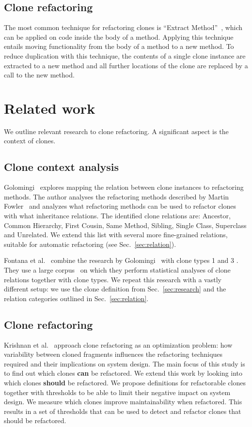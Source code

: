 \documentclass[sigconf,review,anonymous]{acmart}
\begin{document}
\subsection{Clone refactoring}
The most common technique for refactoring clones is ``Extract Method''~\cite{fowler2018refactoring}, which can be applied on code inside the body of a method. Applying this technique entails moving functionality from the body of a method to a new method. To reduce duplication with this technique, the contents of a single clone instance are extracted to a new method and all further locations of the clone are replaced by a call to the new method.

\section{Related work}\label{sec:relatedwork}
We outline relevant research to clone refactoring. A significant aspect is the context of clones.

\subsection{Clone context analysis}\label{sec:rw:contextanalysis}
Golomingi~\cite{koni2001scenario} explores mapping the relation between clone instances to refactoring methods. The author analyses the refactoring methods described by Martin Fowler~\cite{fowler1999refactoring} and analyzes what refactoring methods can be used to refactor clones with what inheritance relations. The identified clone relations are: Ancestor, Common Hierarchy, First Cousin, Same Method, Sibling, Single Class, Superclass and Unrelated. We extend this list with several more fine-grained relations, suitable for automatic refactoring (see Sec.~\ref{sec:relation}).

Fontana et al.~\cite{fontana2012duplicated, fontana2015duplicated} combine the research by Golomingi~\cite{koni2001scenario} with clone types 1 and 3 \cite{roy2007survey}. They use a large corpus~\cite{tempero2010qualitas} on which they perform statistical analyses of clone relations together with clone types. We repeat this research with a vastly different setup: we use the clone definition from Sec.~\ref{sec:research} and the relation categories outlined in Sec.~\ref{sec:relation}.

\subsection{Clone refactoring}
Krishnan et al.~\cite{krishnan2013refactoring} approach clone refactoring as an optimization problem: how variability between cloned fragments influences the refactoring techniques required and their implications on system design. The main focus of this study is to find out which clones \textbf{can} be refactored. We extend this work by looking into which clones \textbf{should} be refactored. We propose definitions for refactorable clones together with thresholds to be able to limit their negative impact on system design. We measure which clones improve maintainability when refactored. This results in a set of thresholds that can be used to detect and refactor clones that should be refactored.
\end{document}
